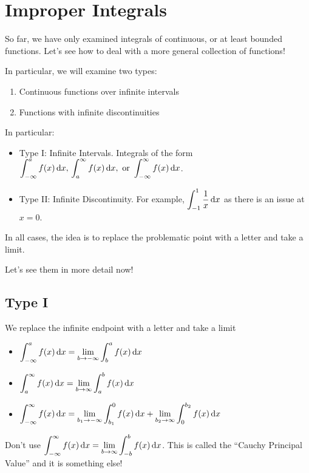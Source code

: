 \section{Improper Integrals}
So far, we have only examined integrals of continuous, or at
least bounded functions. Let's see how to deal with a more general
collection of functions!

In particular, we will examine two types:
\begin{enumerate}[label=(\arabic*)]
    \item Continuous functions over infinite intervals
    \item Functions with infinite discontinuities
\end{enumerate}

In particular:
\begin{itemize}
    \item Type I\@: Infinite Intervals. Integrals of the form
          $ \displaystyle \int_{-\infty}^{a} f(x)\odif{x},\,
              \int_{a}^{\infty} f(x)\odif{x},\text{ or }
              \int_{-\infty}^{\infty} f(x)\odif{x} $.
    \item Type II\@: Infinite Discontinuity. For example,
          $ \displaystyle \int_{-1}^{1} \frac{1}{x} \odif{x} $
          as there is an issue at $ x=0 $.
\end{itemize}

In all cases, the idea is to replace the problematic point with a
letter and take a limit.

Let's see them in more detail now!

\subsection*{Type I}
We replace the infinite endpoint with a letter and take a limit
\begin{itemize}
    \item $ \displaystyle \int_{-\infty}^{a} f(x)\odif{x} =\lim\limits_{{b} \to {-\infty}}
              \int_{b}^{a} f(x)\odif{x} $
    \item $ \displaystyle \int_{a}^{\infty} f(x)\odif{x} =\lim\limits_{{b} \to {\infty}}
              \int_{a}^{b} f(x)\odif{x} $
    \item $ \displaystyle  \int_{-\infty}^{\infty} f(x)\odif{x}=
              \lim\limits_{{b_1} \to {-\infty}} \int_{b_1}^{0} f(x)\odif{x}+
              \lim\limits_{{b_2} \to {\infty}} \int_{0}^{b_2} f(x)\odif{x} $
\end{itemize}
\begin{Remark}{}{}
    Don't use
    $ \displaystyle \int_{-\infty}^{\infty} f(x)\odif{x}=\lim\limits_{{b} \to {\infty}}
        \int_{-b}^{b} f(x)\odif{x} $.
    This is called the ``Cauchy Principal Value'' and it is something else!
\end{Remark}


